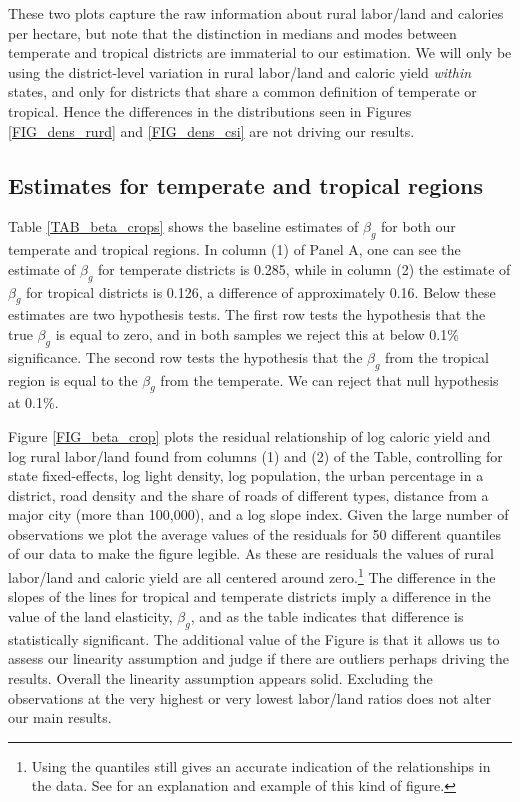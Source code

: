 \documentclass[12pt]{article}
\begin{document}
These two plots capture the raw information about rural labor/land and calories per hectare, but note that the distinction in medians and modes between temperate and tropical districts are immaterial to our estimation. We will only be using the district-level variation in rural labor/land and caloric yield \textit{within} states, and only for districts that share a common definition of temperate or tropical. Hence the differences in the distributions seen in Figures \ref{FIG_dens_rurd} and \ref{FIG_dens_csi} are not driving our results. 

\subsection{Estimates for temperate and tropical regions}
Table \ref{TAB_beta_crops} shows the baseline estimates of $\beta_g$ for both our temperate and tropical regions. In column (1) of Panel A, one can see the estimate of $\beta_g$ for temperate districts is 0.285, while in column (2) the estimate of $\beta_g$ for tropical districts is 0.126, a difference of approximately 0.16. Below these estimates are two hypothesis tests. The first row tests the hypothesis that the true $\beta_g$ is equal to zero, and in both samples we reject this at below 0.1\% significance. The second row tests the hypothesis that the $\beta_g$ from the tropical region is equal to the $\beta_g$ from the temperate. We can reject that null hypothesis at 0.1\%.

Figure \ref{FIG_beta_crop} plots the residual relationship of log caloric yield and log rural labor/land found from columns (1) and (2) of the Table, controlling for state fixed-effects, log light density, log population, the urban percentage in a district, road density and the share of roads of different types, distance from a major city (more than 100,000), and a log slope index. Given the large number of observations we plot the average values of the residuals for 50 different quantiles of our data to make the figure legible. As these are residuals the values of rural labor/land and caloric yield are all centered around zero.\footnote{Using the quantiles still gives an accurate indication of the relationships in the data. See \citet{cfs2013} for an explanation and example of this kind of figure.} The difference in the slopes of the lines for tropical and temperate districts imply a difference in the value of the land elasticity, $\beta_g$, and as the table indicates that difference is statistically significant. The additional value of the Figure is that it allows us to assess our linearity assumption and judge if there are outliers perhaps driving the results. Overall the linearity assumption appears solid. Excluding the observations at the very highest or very lowest labor/land ratios does not alter our main results.
\end{document}
